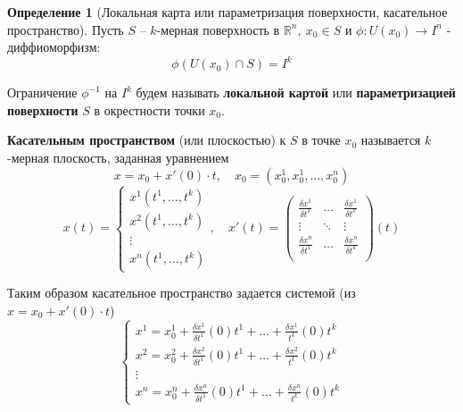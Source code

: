 \documentclass{report}
\theoremstyle{definition}
\newtheorem{definition}{Определение}[section]
\begin{document}
\begin{definition}[Локальная карта или параметризация поверхности, касательное пространство]
  Пусть $S$ -- $k$-мерная поверхность в $\mathbb{R}^n, \ x_0 \in S$ и $\phi: U(x_0) \rightarrow I^n$ - диффиоморфизм:
  \begin{equation*}
    \phi(U(x_0)\cap S) = I^k
  \end{equation*}

  Ограничение $\phi^{-1}$ на $I^k$ будем называть \textbf{локальной картой} или \textbf{параметризацией поверхности} $S$ в окрестности точки $x_0$.

  \textbf{Касательным пространством} (или плоскостью) к $S$ в точке $x_0$ называется $k$-мерная плоскость, заданная уравнением
  \begin{equation*}
    x = x_0 + x'(0) \cdot t, \quad x_0 = (x^1_0,x^1_0,\ldots,x^n_0)
  \end{equation*}
  \begin{equation*}
    x(t) = \left\{\begin{array}{l}
      x^1(t^1,\ldots,t^k) \\
      x^2(t^1,\ldots,t^k) \\
      \vdots              \\
      x^n(t^1,\ldots,t^k)
    \end{array}\right., \quad x'(t) = \left(\begin{array}{ccc}
        \frac{\delta x^1}{\delta t^1} & \ldots & \frac{\delta x^1}{\delta t^k} \\
        \vdots                        & \ddots & \vdots                        \\
        \frac{\delta x^n}{\delta t^1} & \ldots & \frac{\delta x^n}{\delta t^k} \\
      \end{array}\right) (t)
  \end{equation*}

  Таким образом касательное пространство задается системой (из $x = x_0 + x'(0) \cdot t$)
  \begin{equation*}
    \left\{\begin{array}{l}
      x^1 = x^1_0 + \frac{\delta x^1}{\delta t^1} (0)t^1 + \ldots + \frac{\delta x^1}{t^k}(0)t^k \\
      x^2 = x^2_0 + \frac{\delta x^2}{\delta t^1} (0)t^1 + \ldots + \frac{\delta x^2}{t^k}(0)t^k \\
      \vdots                                                                                     \\
      x^n = x^n_0 + \frac{\delta x^n}{\delta t^1} (0)t^1 + \ldots + \frac{\delta x^n}{t^k}(0)t^k
    \end{array}\right.
  \end{equation*}
\end{definition}
\end{document}
